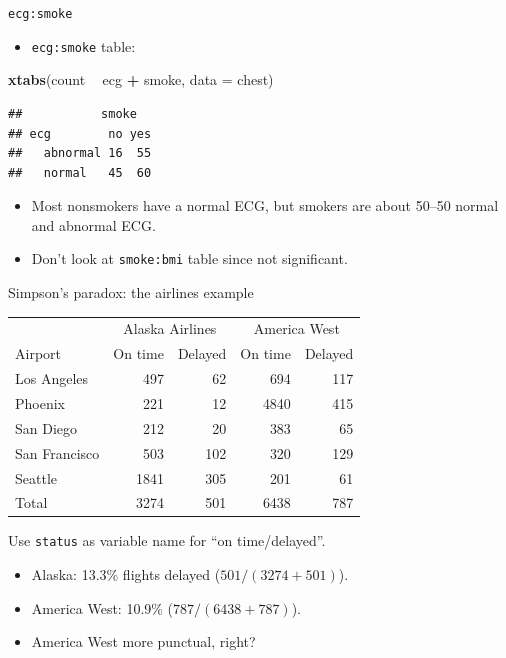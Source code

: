 \documentclass[
  ignorenonframetext,
]{beamer}
\newenvironment{Shaded}{\begin{snugshade}}{\end{snugshade}}
\newcommand{\DataTypeTok}[1]{\textcolor[rgb]{0.13,0.29,0.53}{#1}}
\newcommand{\KeywordTok}[1]{\textcolor[rgb]{0.13,0.29,0.53}{\textbf{#1}}}
\newcommand{\NormalTok}[1]{#1}
\newcommand{\OperatorTok}[1]{\textcolor[rgb]{0.81,0.36,0.00}{\textbf{#1}}}
\newcommand{\StringTok}[1]{\textcolor[rgb]{0.31,0.60,0.02}{#1}}
\providecommand{\tightlist}{%
  \setlength{\itemsep}{0pt}\setlength{\parskip}{0pt}}
\begin{document}
\begin{frame}[fragile]{\texttt{ecg:smoke}}
\protect\hypertarget{ecgsmoke}{}

\begin{itemize}
\tightlist
\item
  \texttt{ecg:smoke} table:
\end{itemize}

\begin{Shaded}
\begin{Highlighting}[]
\KeywordTok{xtabs}\NormalTok{(count }\OperatorTok{~}\StringTok{ }\NormalTok{ecg }\OperatorTok{+}\StringTok{ }\NormalTok{smoke, }\DataTypeTok{data =}\NormalTok{ chest)}
\end{Highlighting}
\end{Shaded}

\begin{verbatim}
##           smoke
## ecg        no yes
##   abnormal 16  55
##   normal   45  60
\end{verbatim}

\begin{itemize}
\item
  Most nonsmokers have a normal ECG, but smokers are about 50--50 normal
  and abnormal ECG.
\item
  Don't look at \texttt{smoke:bmi} table since not significant.
\end{itemize}

\end{frame}

\begin{frame}[fragile]{Simpson's paradox: the airlines example}
\protect\hypertarget{simpsons-paradox-the-airlines-example}{}

\begin{tabular}{|l|rr|rr|}
\hline
& \multicolumn{2}{|c|}{Alaska Airlines} & 
\multicolumn{2}{|c|}{America West}\\
Airport & On time & Delayed & On time & Delayed\\
\hline
Los Angeles & 497 & 62 & 694 & 117\\
Phoenix & 221 & 12 & 4840 & 415\\
San Diego & 212 & 20 & 383 & 65\\
San Francisco & 503 & 102 & 320 & 129 \\
Seattle & 1841 & 305 & 201 & 61\\
\hline
Total & 3274 & 501 & 6438 & 787\\
\hline
\end{tabular}
\vspace{2ex}

Use \texttt{status} as variable name for ``on time/delayed''.

\begin{itemize}
\item
  Alaska: 13.3\% flights delayed (\(501/(3274+501)\)).
\item
  America West: 10.9\% (\(787/(6438+787)\)).
\item
  America West more punctual, right?
\end{itemize}

\end{frame}
\end{document}

